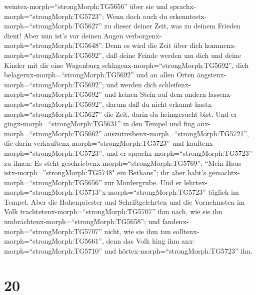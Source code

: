 weintex-morph=``strongMorph:TG5656'' über sie  und
sprachx-morph=``strongMorph:TG5723'': Wenn doch auch du
erkenntestx-morph=``strongMorph:TG5627'' zu dieser deiner Zeit, was zu
deinem Frieden dient! Aber nun ist's vor deinen Augen
verborgenx-morph=``strongMorph:TG5648''.  Denn es wird die
Zeit über dich kommenx-morph=``strongMorph:TG5692'', daß deine Feinde
werden um dich und deine Kinder mit dir eine Wagenburg
schlagenx-morph=``strongMorph:TG5692'', dich
belagernx-morph=``strongMorph:TG5692'' und an allen Orten
ängstenx-morph=``strongMorph:TG5692'';  und werden dich
schleifenx-morph=``strongMorph:TG5692'' und keinen Stein auf dem andern
lassenx-morph=``strongMorph:TG5692'', darum daß du nicht erkannt
hastx-morph=``strongMorph:TG5627'' die Zeit, darin du heimgesucht bist.
 Und er gingx-morph=``strongMorph:TG5631'' in den Tempel
und fing anx-morph=``strongMorph:TG5662''
auszutreibenx-morph=``strongMorph:TG5721'', die darin
verkauftenx-morph=``strongMorph:TG5723'' und
kauftenx-morph=``strongMorph:TG5723'',  und er
sprachx-morph=``strongMorph:TG5723'' zu ihnen: Es steht
geschriebenx-morph=``strongMorph:TG5769'': ``Mein Haus
istx-morph=''strongMorph:TG5748" ein Bethaus''; ihr aber habt's
gemachtx-morph=``strongMorph:TG5656'' zur Mördergrube.  Und
er lehrtex-morph=``strongMorph:TG5713''x-morph=``strongMorph:TG5723''
täglich im Tempel. Aber die Hohenpriester und Schriftgelehrten und die
Vornehmsten im Volk trachtetenx-morph=``strongMorph:TG5707'' ihm nach,
wie sie ihn umbrächtenx-morph=``strongMorph:TG5658'';  und
fandenx-morph=``strongMorph:TG5707'' nicht, wie sie ihm tun
solltenx-morph=``strongMorph:TG5661'', denn das Volk hing ihm
anx-morph=``strongMorph:TG5710'' und hörtex-morph=``strongMorph:TG5723''
ihn.

\hypertarget{section-19}{%
\section{20}\label{section-19}}

